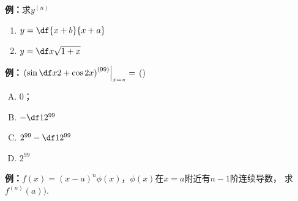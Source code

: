{\bf 例：}求$y^{(n)}$
\begin{enumerate}[(1)]
  \setlength{\itemindent}{1cm}
  \item $y=\df{x+b}{x+a}$
  \item $y=\df x{\sqrt{1+x}}$
\end{enumerate}

{\bf 例：}$\left.\left(\sin\df x2+\cos2x\right)^{(99)}\right|_{x=\pi}=$
(\underline{\hspace{2cm}})
\begin{enumerate}[(A)]
  \setlength{\itemindent}{1cm}
  \item $0$；
  \item $-\df1{2^{99}}$
  \item $2^{99}-\df1{2^{99}}$
  \item $2^{99}$
\end{enumerate}

{\bf 例：}$f(x)=(x-a)^n\phi(x)$，$\phi(x)$在$x=a$附近有$n-1$阶连续导数，
求$f^{(n)}(a))$.

% 
% 
